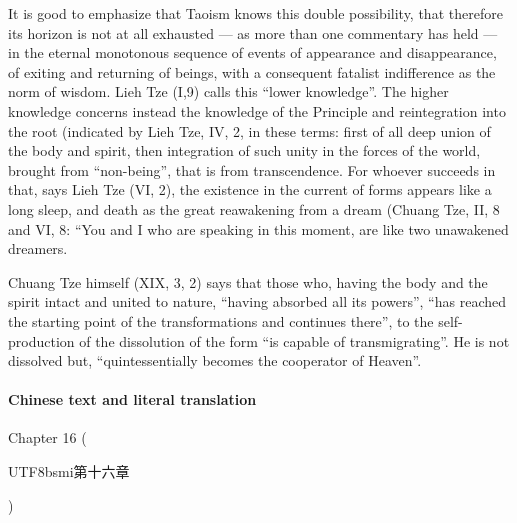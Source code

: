 It is good to emphasize that Taoism knows this double possibility, that therefore its horizon is not at all exhausted --- as more than one commentary has held --- in the eternal monotonous sequence of events of appearance and disappearance, of exiting and returning of beings, with a consequent fatalist indifference as the norm of wisdom. Lieh Tze (I,9) calls this ``lower knowledge''. The higher knowledge concerns instead the knowledge of the Principle and reintegration into the root (indicated by Lieh Tze, IV, 2, in these terms: first of all deep union of the body and spirit, then integration of such unity in the forces of the world, brought from ``non-being'', that is from transcendence. For whoever succeeds in that, says Lieh Tze (VI, 2), the existence in the current of forms appears like a long sleep, and death as the great reawakening from a dream (Chuang Tze, II, 8 and VI, 8: ``You and I who are speaking in this moment, are like two unawakened dreamers.

Chuang Tze himself (XIX, 3, 2) says that those who, having the body and the spirit intact and united to nature, ``having absorbed all its powers'', ``has reached the starting point of the transformations and continues there'', to the self-production of the dissolution of the form ``is capable of transmigrating''. He is not dissolved but, ``quintessentially becomes the cooperator of Heaven''.

\paragraph{Chinese text and literal translation}

Chapter 16 (\begin{CJK*}{UTF8}{bsmi}第十六章\end{CJK*})

